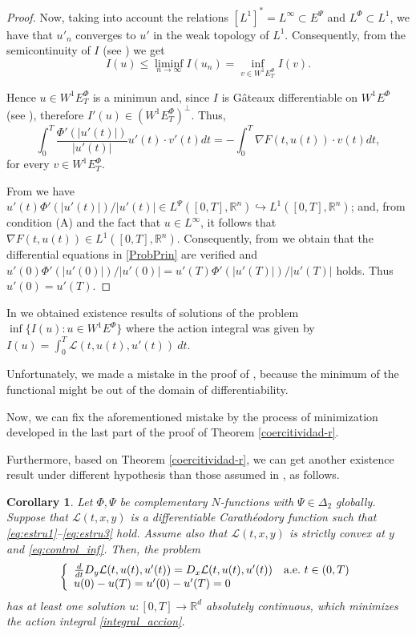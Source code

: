\documentclass[twoside]{article}
\newtheorem{cor}[thm]{Corollary}
\theoremstyle{remark}
\newcommand{\lphi}{L^{\Phi}}
\newcommand{\lpsi}{L^{\Psi}}
\newcommand{\ephi}{E^{\Phi}}
\newcommand{\wphiet}{W^{1}\ephi_T}
\newcommand{\wphie}{W^{1}\ephi}
\newcommand{\rr}{\mathbb{R}}
\renewcommand{\leq}{\leqslant}
\newcommand{\epsi}{E^{\Psi}}
\begin{document}
\begin{proof}
Now, taking into account the relations $\left[L^1\right]^*=L^{\infty}\subset  \epsi$ and $\lphi\subset L^1$, we have that $u'_n$ converges to $u'$ in the weak topology of $L^1$. Consequently,  from the semicontinuity of $I$ (see \cite[Lemma 6.1]{ABGMS2015})  we get 
\[I(u)\leq  \liminf_{n\to\infty}I(u_n)=\inf\limits_{v\in\wphie_T}I(v).\]

Hence $u\in \wphiet$ is a minimun and, since $I$ is G\^ateaux differentiable on $\wphie$ (see  \cite[Thm. 3.2]{ABGMS2015}), 
therefore $I'(u)\in (\wphiet)^{\perp}$. Thus,
\[\int_0^T \frac{\Phi'(|u'(t)|)}{|u'(t)|}u'(t)\cdot v'(t)dt =-\int_0^T \nabla F(t,u(t))\cdot v(t)dt,\]
for every  $v\in \wphiet$.  

From \cite[Lemma 2.4]{ABGMS2015} we have 
 $u'(t)\Phi'(|u'(t)|)/|u'(t)|\in \lpsi([0,T],\rr^n)\hookrightarrow L^1([0,T],\rr^n)$; 
and,  from condition (A) and the fact that $u\in L^{\infty}$, it follows that $\nabla F(t,u(t))\in L^1([0,T],\rr^n)$. 
Consequently, from \cite[p. 6]{mawhin2010critical} we obtain that the differential equations in \eqref{ProbPrin} 
are verified and $u'(0)\Phi'(|u'(0)|)/|u'(0)|=u'(T)\Phi'(|u'(T)|)/|u'(T)|$ holds. Thus $u'(0)=u'(T)$.
\end{proof}


In  \cite[Thm. 6.2]{ABGMS2015} we obtained existence results of solutions of the problem 
$\inf\{I(u):u \in \wphie \}$ 
where the action integral was given by $I(u)=\int_{0}^T \mathcal{L}(t,u(t),u'(t))\ dt$. 

Unfortunately, we made a mistake in the proof of \cite[Thm. 4.1]{ABGMS2015}, 
because  the minimum of the functional  might be out of the domain of differentiability.

Now, we can fix the aforementioned mistake by the process of minimization developed 
in the last part of the proof of Theorem \ref{coercitividad-r}.

Furthermore, based on Theorem \ref{coercitividad-r},
we can get another existence result under different hypothesis  than those assumed in \cite[Thm. 6.2]{ABGMS2015}, as follows.


\begin{cor}
Let $\Phi,\Psi$ be complementary $N$-functions with $\Psi \in \Delta_2$ globally.
Suppose that  $\mathcal{L}(t,x,y)$ is a differentiable Carath\'eodory function such that  \eqref{eq:estru1}--\eqref{eq:estru3} hold.
Assume also that $\mathcal{L}(t,x,y)$ is strictly convex at $y$ and \eqref{eq:control_inf}.
Then, the problem
\begin{equation}
    \left\{%
\begin{array}{ll}
  \frac{d}{dt} D_{y}\mathcal{L}(t,u(t),u'(t))= D_{x}\mathcal{L}(t,u(t),u'(t)) \quad \hbox{a.e.}\ t \in (0,T)\\
    u(0)-u(T)=u'(0)-u'(T)=0
\end{array}%
\right.
\end{equation}
has at least one solution $u:[0,T]\to\rr^d$ absolutely continuous, 
which minimizes the action integral \eqref{integral_accion}.
\end{cor}
\end{document}
